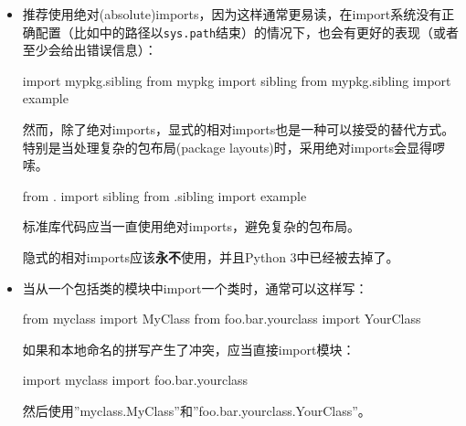 \documentclass[ignorenonframetext,9pt]{beamer}
\newenvironment{Shaded}{}{}
\newcommand{\ImportTok}[1]{#1}
\newcommand{\NormalTok}[1]{#1}
\begin{document}
\begin{frame}[fragile]

\begin{itemize}
\item
  推荐使用绝对(absolute)imports，因为这样通常更易读，在import系统没有正确配置（比如中的路径以\texttt{sys.path}结束）的情况下，也会有更好的表现（或者至少会给出错误信息）：

\begin{Shaded}
\begin{Highlighting}[]
\ImportTok{import}\NormalTok{ mypkg.sibling}
\ImportTok{from}\NormalTok{ mypkg }\ImportTok{import}\NormalTok{ sibling}
\ImportTok{from}\NormalTok{ mypkg.sibling }\ImportTok{import}\NormalTok{ example}
\end{Highlighting}
\end{Shaded}

  然而，除了绝对imports，显式的相对imports也是一种可以接受的替代方式。特别是当处理复杂的包布局(package
  layouts)时，采用绝对imports会显得啰嗦。

\begin{Shaded}
\begin{Highlighting}[]
\ImportTok{from}\NormalTok{ . }\ImportTok{import}\NormalTok{ sibling}
\ImportTok{from}\NormalTok{ .sibling }\ImportTok{import}\NormalTok{ example}
\end{Highlighting}
\end{Shaded}

  标准库代码应当一直使用绝对imports，避免复杂的包布局。

  隐式的相对imports应该\textbf{永不}使用，并且Python 3中已经被去掉了。
\end{itemize}

\end{frame}

\begin{frame}[fragile]

\begin{itemize}
\item
  当从一个包括类的模块中import一个类时，通常可以这样写：

\begin{Shaded}
\begin{Highlighting}[]
\ImportTok{from}\NormalTok{ myclass }\ImportTok{import}\NormalTok{ MyClass}
\ImportTok{from}\NormalTok{ foo.bar.yourclass }\ImportTok{import}\NormalTok{ YourClass}
\end{Highlighting}
\end{Shaded}

  如果和本地命名的拼写产生了冲突，应当直接import模块：

\begin{Shaded}
\begin{Highlighting}[]
\ImportTok{import}\NormalTok{ myclass}
\ImportTok{import}\NormalTok{ foo.bar.yourclass}
\end{Highlighting}
\end{Shaded}

  然后使用''myclass.MyClass''和''foo.bar.yourclass.YourClass''。
\end{itemize}

\end{frame}
\end{document}
